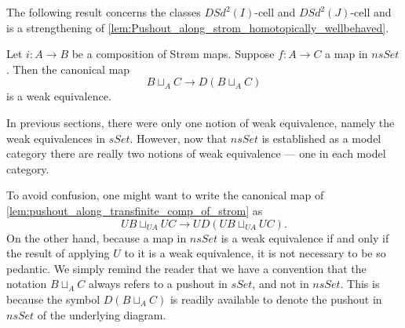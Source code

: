The following result concerns the classes $DSd^2(I)$-cell and $DSd^2(J)$-cell and is a strengthening of \cref{lem:Pushout_along_strom_homotopically_wellbehaved}.
\begin{lemma}\label{lem:pushout_along_transfinite_comp_of_strom}
Let $i:A\to B$ be a composition of Str\o m maps. Suppose $f:A\to C$ a map in $nsSet$. Then the canonical map
\[B\sqcup _AC\to D(B\sqcup _AC)\]
is a weak equivalence.
\end{lemma}
\noindent In previous sections, there were only one notion of weak equivalence, namely the weak equivalences in $sSet$. However, now that $nsSet$ is established as a model category there are really two notions of weak equivalence --- one in each model category.

To avoid confusion, one might want to write the canonical map of \cref{lem:pushout_along_transfinite_comp_of_strom} as
\[UB\sqcup _{UA}UC\to UD(UB\sqcup _{UA}UC).\]
On the other hand, because a map in $nsSet$ is a weak equivalence if and only if the result of applying $U$ to it is a weak equivalence, it is not necessary to be so pedantic. We simply remind the reader that we have a convention that the notation $B\sqcup _AC$ always refers to a pushout in $sSet$, and not in $nsSet$. This is because the symbol $D(B\sqcup _AC)$ is readily available to denote the pushout in $nsSet$ of the underlying diagram.
